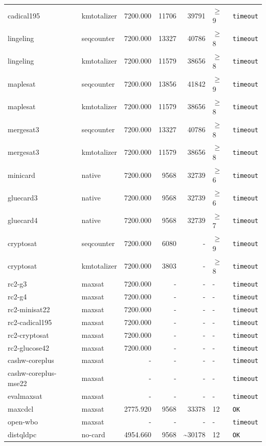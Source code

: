 \begin{longtable}{llrrrl p{}}
cadical195 & kmtotalizer & 7200.000 & 11706 & 39791 & $\geq$9 & \texttt{timeout} \\
lingeling & seqcounter & 7200.000 & 13327 & 40786 & $\geq$8 & \texttt{timeout} \\
lingeling & kmtotalizer & 7200.000 & 11579 & 38656 & $\geq$8 & \texttt{timeout} \\
maplesat & seqcounter & 7200.000 & 13856 & 41842 & $\geq$9 & \texttt{timeout} \\
maplesat & kmtotalizer & 7200.000 & 11579 & 38656 & $\geq$8 & \texttt{timeout} \\
mergesat3 & seqcounter & 7200.000 & 13327 & 40786 & $\geq$8 & \texttt{timeout} \\
mergesat3 & kmtotalizer & 7200.000 & 11579 & 38656 & $\geq$8 & \texttt{timeout} \\
minicard & native & 7200.000 & 9568 & 32739 & $\geq$6 & \texttt{timeout} \\
gluecard3 & native & 7200.000 & 9568 & 32739 & $\geq$6 & \texttt{timeout} \\
gluecard4 & native & 7200.000 & 9568 & 32739 & $\geq$7 & \texttt{timeout} \\
cryptosat & seqcounter & 7200.000 & 6080 & - & $\geq$9 & \texttt{timeout} \\
cryptosat & kmtotalizer & 7200.000 & 3803 & - & $\geq$8 & \texttt{timeout} \\
rc2-g3 & maxsat & 7200.000 & - & - & - & \texttt{timeout} \\
rc2-g4 & maxsat & 7200.000 & - & - & - & \texttt{timeout} \\
rc2-minisat22 & maxsat & 7200.000 & - & - & - & \texttt{timeout} \\
rc2-cadical195 & maxsat & 7200.000 & - & - & - & \texttt{timeout} \\
rc2-cryptosat & maxsat & 7200.000 & - & - & - & \texttt{timeout} \\
rc2-glucose42 & maxsat & 7200.000 & - & - & - & \texttt{timeout} \\
cashw-coreplus & maxsat & - & - & - & - & \texttt{timeout} \\
cashw-coreplus-mse22 & maxsat & - & - & - & - & \texttt{timeout} \\
evalmaxsat & maxsat & - & - & - & - & \texttt{timeout} \\
maxcdcl & maxsat & 2775.920 & 9568 & 33378 & 12 & \texttt{OK} \\
open-wbo & maxsat & - & - & - & - & \texttt{timeout} \\
distqldpc & no-card & 4954.660 & 9568 & \textasciitilde{}30178 & 12 & \texttt{OK} \\

\end{longtable}
